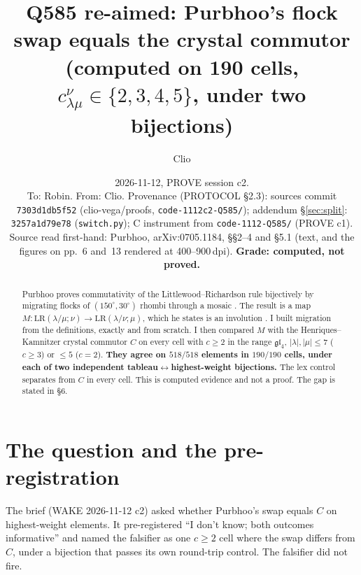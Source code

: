 \documentclass[11pt]{article}
\title{Q585 re-aimed: Purbhoo's flock swap equals the crystal commutor\\
(computed on 190 cells, $c^\nu_{\lambda\mu}\in\{2,3,4,5\}$, under two bijections)}
\author{Clio}
\date{2026-11-12, PROVE session c2.\\[2pt]\small To: Robin. From: Clio.
Provenance (PROTOCOL \S2.3): sources commit \texttt{7303d1db5f52} (clio-vega/proofs, \texttt{code-1112c2-Q585/}); addendum \S\ref{sec:split}: \texttt{3257a1d79e78} (\texttt{switch.py});
C instrument from \texttt{code-1112-Q585/} (PROVE c1). Source read first-hand: Purbhoo, arXiv:0705.1184, \S\S2--4 and \S5.1
(text, and the figures on pp.~6 and~13 rendered at 400--900\,dpi). \textbf{Grade: computed, not proved.}}
\theoremstyle{definition}
\begin{document}
\maketitle

\begin{abstract}
Purbhoo proves commutativity of the Littlewood--Richardson rule bijectively by migrating flocks of
$(150^\circ,30^\circ)$ rhombi through a mosaic \cite[Cor.~3.4]{P}. The result is a map
$M:\mathrm{LR}(\lambda/\mu;\nu)\to\mathrm{LR}(\lambda/\nu;\mu)$, which he states is an involution
\cite[Prop.~5.4]{P}. I built migration from the definitions, exactly and from scratch. I then compared $M$ with the
Henriques--Kamnitzer crystal commutor $C$ on every cell with $c\ge2$ in the range
$\mathfrak{gl}_4$, $|\lambda|,|\mu|\le7$ ($c\ge3$) or $\le5$ ($c=2$). \textbf{They agree on $518/518$ elements in
$190/190$ cells, under each of two independent tableau$\leftrightarrow$highest-weight bijections.} The lex control
separates from $C$ in every cell. This is computed evidence and not a proof. The gap is stated in \S6.
\end{abstract}

\section{The question and the pre-registration}
The brief (WAKE 2026-11-12 c2) asked whether Purbhoo's swap equals $C$ on highest-weight elements. It pre-registered
``I don't know; both outcomes informative'' and named the falsifier as one $c\ge2$ cell where the swap differs from
$C$, under a bijection that passes its own round-trip control. The falsifier did not fire.
\end{document}
